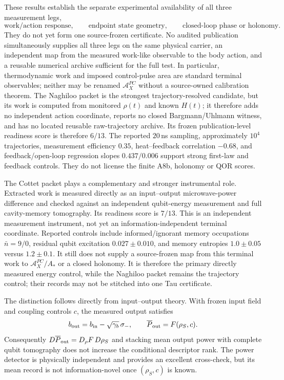 These results establish the separate experimental availability of all three
measurement legs,
\begin{equation}
 \text{work/action response},\qquad
 \text{endpoint state geometry},\qquad
 \text{closed-loop phase or holonomy}.
 \label{eq:alternative-source-legs}
\end{equation}
They do not yet form one source-frozen certificate. No audited publication
simultaneously supplies all three legs on the same physical carrier, an
independent map from the measured work-like observable to the body action,
and a reusable numerical archive sufficient for the full test. In
particular, thermodynamic work and imposed control-pulse area are standard
terminal observables; neither may be renamed
$\mathcal A_X^{PC}$ without a source-owned calibration theorem.
The Naghiloo packet is the strongest trajectory-resolved candidate, but its
work is computed from monitored $\rho(t)$ and known $H(t)$; it therefore adds
no independent action coordinate, reports no closed Bargmann/Uhlmann witness,
and has no located reusable raw-trajectory archive.
Its frozen publication-level readiness score is therefore $6/13$. The reported
$20\,$ns sampling, approximately $10^4$ trajectories, measurement efficiency
$0.35$, heat--feedback correlation $-0.68$, and feedback/open-loop regression
slopes $0.437/0.006$ support strong first-law and feedback controls. They do
not license the finite A8b, holonomy or QOR scores.

The Cottet packet plays a complementary and stronger instrumental role.
Extracted work is measured directly as an input--output microwave-power
difference and checked against an independent qubit-energy measurement and
full cavity-memory tomography. Its readiness score is $7/13$. This is an
independent measurement instrument, not yet an information-independent
terminal coordinate. Reported controls include informed/ignorant memory
occupations $\bar n=9/0$, residual qubit excitation $0.027\pm0.010$, and memory
entropies $1.0\pm0.05$ versus $1.2\pm0.1$. It still does not supply a
source-frozen map from this terminal work to $\mathcal A_X^{PC}/A_*$ or a
closed holonomy. It is therefore the primary directly measured energy control,
while the Naghiloo packet remains the trajectory control; their records may
not be stitched into one Tau certificate.

The distinction follows directly from input--output theory. With frozen input
field and coupling controls $c$, the measured output satisfies
\begin{equation}
 b_{\rm out}=b_{\rm in}-\sqrt{\gamma_b}\,\sigma_- ,
 \qquad
 \overline P_{\rm out}=F(\rho_S,c).
 \label{eq:cottet-factorization}
\end{equation}
Consequently
$D\overline P_{\rm out}=D_\rho F\,D\rho_S$ and stacking mean output power with
complete qubit tomography does not increase the conditional descriptor rank.
The power detector is physically independent and provides an excellent
cross-check, but its mean record is not information-novel once $(\rho_S,c)$ is
known.

